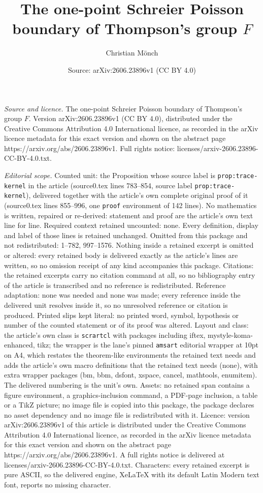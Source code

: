 \documentclass[10pt,a4paper]{amsart}
\title[The one-point Schreier Poisson boundary of Thompson's group ]{The one-point Schreier Poisson boundary of Thompson's group $F$}
\author{Christian M\"onch}
\date{Source: arXiv:2606.23896v1 (CC BY 4.0)}
\begin{document}
\maketitle

\noindent\emph{Source and licence.} The one-point Schreier Poisson boundary of Thompson's group $F$. Version arXiv:2606.23896v1 (CC BY 4.0), distributed under the Creative Commons Attribution 4.0 International licence, as recorded in the arXiv licence metadata for this exact version and shown on the abstract page https://arxiv.org/abs/2606.23896v1. Full rights notice: licenses/arxiv-2606.23896-CC-BY-4.0.txt.\par\smallskip

\noindent\textit{Editorial scope.} Counted unit: the Proposition whose source label is \texttt{prop:trace-kernel} in the article (source0.tex lines 783--854, source label \texttt{prop:trace-kernel}), delivered together with the article's own complete original proof of it (source0.tex lines 855--996, one \texttt{proof} environment of 142 lines). No mathematics is written, repaired or re-derived: statement and proof are the article's own text line for line. Required context retained uncounted: none. Every definition, display and label of those lines is retained unchanged. Omitted from this package and not redistributed: 1--782, 997--1576. Nothing inside a retained excerpt is omitted or altered: every retained body is delivered exactly as the article's lines are written, so no omission receipt of any kind accompanies this package. Citations: the retained excerpts carry no citation command at all, so no bibliography entry of the article is transcribed and no reference is redistributed. Reference adaptation: none was needed and none was made; every reference inside the delivered unit resolves inside it, so no unresolved reference or citation is produced. Printed slips kept literal: no printed word, symbol, hypothesis or number of the counted statement or of its proof was altered. Layout and class: the article's own class is \texttt{scrartcl} with packages including iftex, mystyle-koma-enhanced, tikz; the wrapper is the lane's pinned \texttt{amsart} editorial wrapper at 10pt on A4, which restates the theorem-like environments the retained text needs and adds the article's own macro definitions that the retained text needs (none), with extra wrapper packages (bm, bbm, dsfont, xspace, cancel, mathtools, enumitem). The delivered numbering is the unit's own. Assets: no retained span contains a figure environment, a graphics-inclusion command, a PDF-page inclusion, a table or a TikZ picture; no image file is copied into this package, the package declares no asset dependency and no image file is redistributed with it. Licence: version arXiv:2606.23896v1 of this article is distributed under the Creative Commons Attribution 4.0 International licence, as recorded in the arXiv licence metadata for this exact version and shown on the abstract page https://arxiv.org/abs/2606.23896v1. A full rights notice is delivered at licenses/arxiv-2606.23896-CC-BY-4.0.txt. Characters: every retained excerpt is pure ASCII, so the delivered engine, XeLaTeX with its default Latin Modern text font, reports no missing character.
\end{document}
